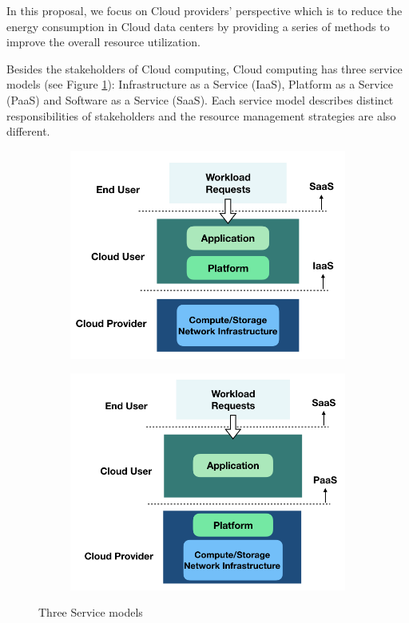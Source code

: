 In this proposal, we focus on Cloud providers' perspective which is to reduce the energy consumption in Cloud data centers by providing a series of methods to improve the overall resource utilization.

Besides the stakeholders of Cloud computing, Cloud computing has three service models \cite{Mell:2011jj} (see Figure \ref{fig:service_models}): Infrastructure as a Service (IaaS), Platform as a Service (PaaS) and Software as a Service (SaaS). 
Each service model describes distinct responsibilities of stakeholders and the resource management strategies are also different.

\begin{figure}[H]
	\centering
	\begin{subfigure}[b]{0.45\textwidth}
		\includegraphics[width=\textwidth]{pics/iaas.png}
		\caption{}
	\end{subfigure}
	\begin{subfigure}[b]{0.45\textwidth}
		\includegraphics[width=\textwidth]{pics/paas.png}
	\caption{}
	\end{subfigure}
	\caption{Three Service models \cite{Jennings:2015ht}}
	\label{fig:service_models}
\end{figure}

